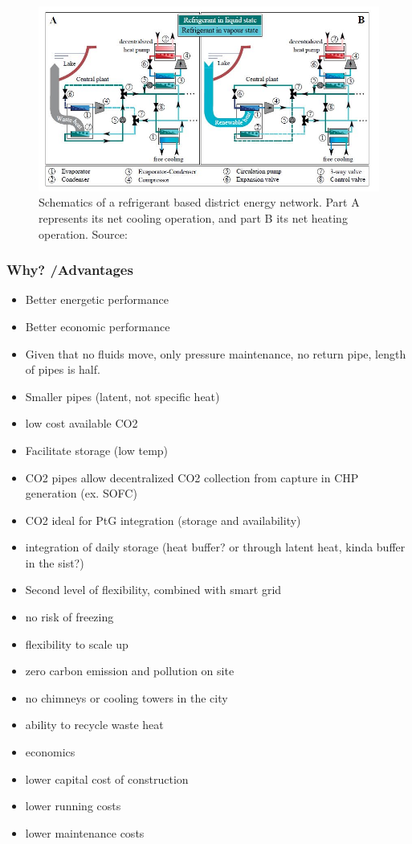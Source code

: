 \documentclass{article}
\begin{document}
\begin{figure}[h!]
\centering
\includegraphics[width=1\textwidth]{CO2schema.JPG}
\caption{Schematics of a refrigerant based district energy network. Part A represents its net cooling operation, and part B its net heating operation. Source: \cite{henchozPotentialRefrigerantBased}}
\label{fig:CO2schema}
\end{figure}


\subsubsection{Why? /Advantages}

\begin{itemize}
	\item Better energetic performance
	\item Better economic performance
	
	\item Given that no fluids move, only pressure maintenance, no return pipe, length of pipes is half. 
	\item Smaller pipes (latent, not specific heat)
	\item low cost available CO2
	
	\item Facilitate storage (low temp)
	\item CO2 pipes allow decentralized CO2 collection from capture in CHP generation (ex. SOFC)
	\item CO2 ideal for PtG integration (storage and availability)
	\item integration of daily storage (heat buffer? or through latent heat, kinda buffer in the sist?)
	\item Second level of flexibility, combined with smart grid
	
	\item no risk of freezing
	
	\item flexibility to scale up
	\item zero carbon emission and pollution on site
	\item no chimneys or cooling towers in the city
	\item ability to recycle waste heat
	\item economics
	\item lower capital cost of construction
	\item lower running costs
	\item lower maintenance costs
\end{itemize}
\end{document}
